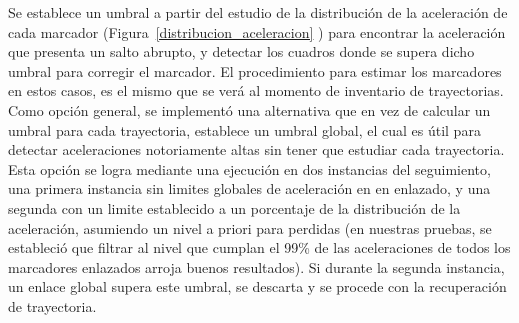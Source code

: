 \begin{itemize}
Se establece un umbral a partir del estudio de la distribución de la aceleración de cada marcador (Figura~\ref{distribucion_aceleracion} ) para encontrar la aceleración que presenta un salto abrupto, y detectar los cuadros donde se supera dicho umbral para corregir el marcador. El procedimiento para estimar los marcadores en estos casos, es el mismo que se verá al momento de inventario de trayectorias. 
\\ 

Como opción general, se implementó una alternativa que en vez de calcular un umbral para cada trayectoria, establece un umbral global, el cual es útil para detectar aceleraciones notoriamente altas sin tener que estudiar cada trayectoria. Esta opción se logra mediante una ejecución en dos instancias del seguimiento, una primera instancia sin limites globales de aceleración en en enlazado, y una segunda con un limite establecido a un porcentaje de la distribución de la aceleración, asumiendo un nivel a priori para perdidas (en nuestras pruebas, se estableció que filtrar al nivel que cumplan el 99\% de las aceleraciones de todos los marcadores enlazados arroja buenos resultados). Si durante la segunda instancia, un enlace global supera este umbral, se descarta y se procede con la recuperación de trayectoria.


\end{itemize}
